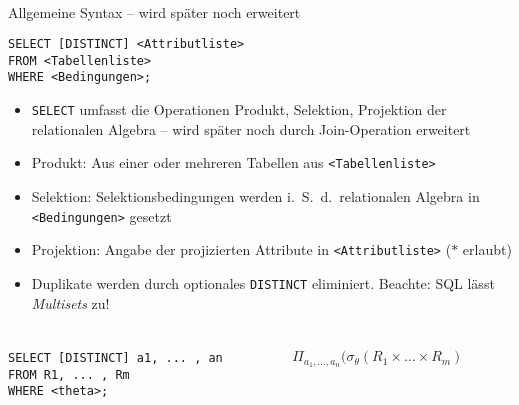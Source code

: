 \begin{frame}[fragile]
\frametitle{\insertsection}
\framesubtitle{\insertsubsection}
\onslide
	\\[4pt]
	\begin{block}{Allgemeine Syntax -- wird sp\"ater noch erweitert}
		\begin{lstlisting}[xleftmargin=3ex]
SELECT [DISTINCT] <Attributliste>
FROM <Tabellenliste>
WHERE <Bedingungen>;
		\end{lstlisting}
	\end{block}
\abs\pause
	\begin{itemize}
		\item \texttt{SELECT} umfasst die Operationen Produkt, Selektion, Projektion der 
		relationalen Algebra -- wird sp\"ater noch durch Join-Operation erweitert
		\item Produkt: Aus einer oder mehreren Tabellen aus \texttt{<Tabellenliste>}
		\item Selektion: Selektionsbedingungen werden i.~S.~d.~relationalen Algebra in 
		\texttt{<Bedingungen>} gesetzt
		\item Projektion: Angabe der projizierten Attribute in \texttt{<Attributliste>} ($*$ erlaubt)
		\item Duplikate werden durch optionales \texttt{DISTINCT} eliminiert. Beachte: SQL l\"asst 
		\emph{Multisets} zu!
	\end{itemize}
\end{frame}

\begin{frame}[fragile]\frametitle{\insertsection}
\framesubtitle{\insertsubsection}
\begin{columns}
\begin{column}{.48\textwidth}
\begin{lstlisting}[xleftmargin=2ex]
SELECT [DISTINCT] a1, ... , an
FROM R1, ... , Rm
WHERE <theta>;
\end{lstlisting}
\end{column}
\begin{column}{.48\textwidth}
$\Pi_{a_1,\dots,a_n}(\sigma_\theta(R_1\times \dots \times R_m)$
\end{column}
\end{columns}
\abs
\end{frame}

